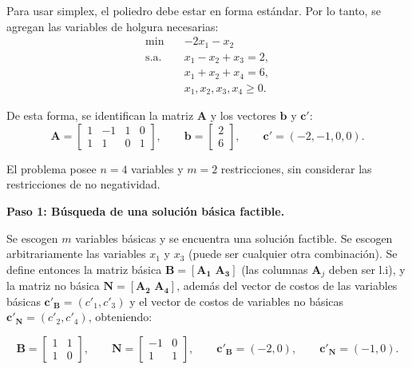 \begin{enumerate}
    Para usar simplex, el poliedro debe estar en forma estándar. Por lo tanto, se agregan las variables de holgura necesarias:
    \begin{equation}
        \begin{aligned}
            \min \quad & -2x_1 - x_2 \\
            \text{s.a.} \quad 
            & x_1 - x_2 + x_3 = 2, \\
            & x_1 + x_2 + x_4 = 6, \\
            & x_1,x_2,x_3,x_4 \geq 0.
        \end{aligned}
    \end{equation}

    De esta forma, se identifican la matriz $\mathbf{A}$ y los vectores $\mathbf{b}$ y $\mathbf{c}'$:
    \begin{equation}
        \mathbf{A}
        =
        \begin{bmatrix}
            1 & -1 & 1 & 0 \\
            1 & 1 & 0 & 1
        \end{bmatrix},
        \qquad
        \mathbf{b}
        =
        \begin{bmatrix}
            2 \\
            6
        \end{bmatrix},
        \qquad
        \mathbf{c}'
        =
        (-2,-1,0,0).
    \end{equation}

    El problema posee $n=4$ variables y $m=2$ restricciones, sin considerar las restricciones de no negatividad.


    \noindent\textbf{Paso 1: Búsqueda de una solución básica factible.}

    Se escogen $m$ variables básicas y se encuentra una solución factible. Se escogen arbitrariamente las variables $x_1$ y $x_3$ (puede ser cualquier otra combinación). Se define entonces la matriz básica $\mathbf{B}=[\mathbf{A_1} \, \, \mathbf{A_3}]$ (las columnas $\mathbf{A}_j$ deben ser l.i), y la matriz no básica $\mathbf{N}=[\mathbf{A_2} \, \, \mathbf{A_4}]$, además del vector de costos de las variables básicas $\mathbf{c'_B}=(c'_1, c'_3)$ y el vector de costos de variables no básicas $\mathbf{c'_N}=(c'_2, c'_4)$, obteniendo:

    
    \begin{equation}
        \mathbf{B}
        =
        \begin{bmatrix}
            1 & 1 \\
            1 & 0
        \end{bmatrix},
        \qquad
        \mathbf{N}
        =
        \begin{bmatrix}
            -1 & 0 \\
            1 & 1
        \end{bmatrix},
        \qquad
        \mathbf{c}'_{\mathbf{B}} = (-2,0),
        \qquad
        \mathbf{c}'_{\mathbf{N}} = (-1,0).
    \end{equation}


\end{enumerate}
